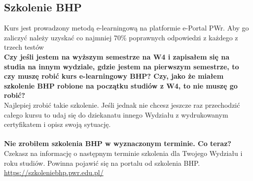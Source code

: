 \documentclass[11pt]{article}
\begin{document}
\subsection{Szkolenie BHP}
\indent \hspace{0.5cm} Kurs jest prowadzony metodą e-learningową na platformie e-Portal PWr. Aby go zaliczyć należy uzyskać co najmniej 70\% poprawnych odpowiedzi z każdego z trzech testów \\
\textbf{Czy jeśli jestem na wyższym semestrze na W4 i zapisałem się na studia na innym wydziale, gdzie jestem na pierwszym semestrze, to czy muszę robić kurs e-learningowy BHP? Czy, jako że miałem szkolenie BHP robione na początku studiów z W4, to nie muszę go robić?} \\
\indent Najlepiej zrobić takie szkolenie. Jeśli jednak nie chcesz jeszcze raz przechodzić całego kursu to udaj się do dziekanatu innego Wydziału z wydrukowanym certyfikatem i opisz swoją sytuację. \\\\
\textbf{Nie zrobiłem szkolenia BHP w wyznaczonym terminie. Co teraz?} \\
\indent Czekasz na informację o następnym terminie szkolenia dla Twojego Wydziału i roku studiów. Powinna pojawić się na portalu od szkolenia BHP. {\color{blue}\url{https://szkoleniebhp.pwr.edu.pl/}}
\end{document}
